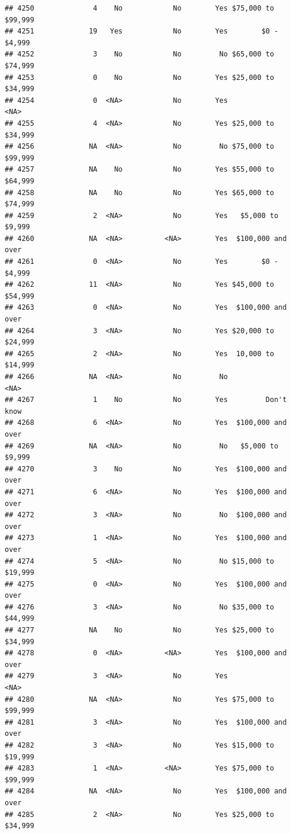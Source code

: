\documentclass[man]{apa6}
\begin{document}
\begin{verbatim}
## 4250              4    No            No        Yes $75,000 to $99,999
## 4251             19   Yes            No        Yes        $0 - $4,999
## 4252              3    No            No         No $65,000 to $74,999
## 4253              0    No            No        Yes $25,000 to $34,999
## 4254              0  <NA>            No        Yes               <NA>
## 4255              4  <NA>            No        Yes $25,000 to $34,999
## 4256             NA  <NA>            No         No $75,000 to $99,999
## 4257             NA    No            No        Yes $55,000 to $64,999
## 4258             NA    No            No        Yes $65,000 to $74,999
## 4259              2  <NA>            No        Yes   $5,000 to $9,999
## 4260             NA  <NA>          <NA>        Yes  $100,000 and over
## 4261              0  <NA>            No        Yes        $0 - $4,999
## 4262             11  <NA>            No        Yes $45,000 to $54,999
## 4263              0  <NA>            No        Yes  $100,000 and over
## 4264              3  <NA>            No        Yes $20,000 to $24,999
## 4265              2  <NA>            No        Yes  10,000 to $14,999
## 4266             NA  <NA>            No         No               <NA>
## 4267              1    No            No        Yes         Don't know
## 4268              6  <NA>            No        Yes  $100,000 and over
## 4269             NA  <NA>            No         No   $5,000 to $9,999
## 4270              3    No            No        Yes  $100,000 and over
## 4271              6  <NA>            No        Yes  $100,000 and over
## 4272              3  <NA>            No         No  $100,000 and over
## 4273              1  <NA>            No        Yes  $100,000 and over
## 4274              5  <NA>            No         No $15,000 to $19,999
## 4275              0  <NA>            No        Yes  $100,000 and over
## 4276              3  <NA>            No         No $35,000 to $44,999
## 4277             NA    No            No        Yes $25,000 to $34,999
## 4278              0  <NA>          <NA>        Yes  $100,000 and over
## 4279              3  <NA>            No        Yes               <NA>
## 4280             NA  <NA>            No        Yes $75,000 to $99,999
## 4281              3  <NA>            No        Yes  $100,000 and over
## 4282              3  <NA>            No        Yes $15,000 to $19,999
## 4283              1  <NA>          <NA>        Yes $75,000 to $99,999
## 4284             NA  <NA>            No        Yes  $100,000 and over
## 4285              2  <NA>            No        Yes $25,000 to $34,999

\end{verbatim}
\end{document}
